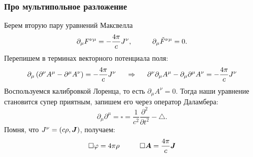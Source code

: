 \subsubsection*{Про мультипольное разложение}
Берем вторую пару уравнений Максвелла
\begin{equation*}
	\partial_\mu F^{\nu \mu} = - \frac{4 \pi }{c} J^\nu,
	\hspace{1 cm}
	\partial_\mu \tilde{F}^{\nu\mu} = 0.
\end{equation*}
Перепишем в терминах векторного потенциала поля:
\begin{equation*}
	\partial_\mu \left(\partial^\nu A^\mu - \partial^\mu A^\nu\right) = -\frac{4 \pi}{c} J^\nu
	\hspace{0.5 cm}
	\Rightarrow
	\hspace{0.5 cm}
	\partial^\nu \partial_\mu  A^\mu - \partial_\mu \partial^\mu A^\nu = -\frac{4 \pi}{c} J^\nu
\end{equation*}
Воспользуемся калибровкой Лоренца, то есть $\partial_\mu A^\nu = 0$. Тогда наши уравнение становится супер приятным, запишем его через оператор Даламбера:
\begin{equation*}
 	\partial_\mu \partial^\mu = \square = \frac{1}{c^2}\frac{\partial^2}{\partial t^2} - \triangle.
 \end{equation*} 
 Помня, что $J^\nu = (c \rho, \mbox{\boldmath $J$})$, получаем:
 \begin{equation}
 	\square \varphi = 4 \pi \rho
 	\hspace{1 cm}
 	\square \mbox{\boldmath $A$} = \frac{4 \pi}{c} \mbox{\boldmath $J$}
 	\label{dalamber}
 \end{equation}

